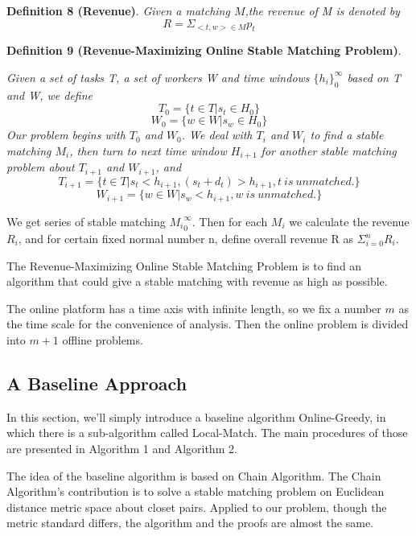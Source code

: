 \documentclass[color,twoside,amssymb,twocolumn]{article}
\begin{document}
\textbf{Definition 8 (Revenue)}. {\it Given a matching $M$,the revenue of M is denoted by 
	\begin{equation}
	R = \Sigma_{<t,w>\in M}p_t
	\end{equation}
}

\textbf{Definition 9 (Revenue-Maximizing Online Stable Matching Problem)}. {\it Given a set of tasks T, a set of workers W and time windows $\{h_i\}_{0}^{\infty}$ based on T and W, we define
	\begin{equation}
	T_0=\{t\in T|s_t \in H_0\}
	\end{equation}
	\begin{equation}
	W_0=\{w\in W|s_w \in H_0\}
	\end{equation}
	Our problem begins with $T_0$ and $W_0$. We deal with $T_i$ and $W_i$ to find a stable matching $M_i$, then turn to next time window $H_{i+1}$ for another stable matching problem about $T_{i+1}$ and $W_{i+1}$, and
	\begin{equation}
	T_{i+1}=\{t\in T|s_t<h_{i+1},(s_t+d_t)>h_{i+1},t\ is\ unmatched.\}
	\end{equation}
	\begin{equation}
	W_{i+1}=\{w\in W|s_w<h_{i+1},w\ is\ unmatched.\}
	\end{equation}
	
We get series of stable matching ${M_i}_0^{\infty}$. Then for each $M_i$ we calculate the revenue $R_i$, and for certain fixed normal number n, define overall revenue R as $\Sigma_{i=0}^{n}R_i$. 

The Revenue-Maximizing Online Stable Matching Problem is to find an algorithm that could give a stable matching with revenue as high as possible. 
}

The online platform has a time axis with infinite length, so we fix a number $m$ as the time scale for the convenience of analysis. Then the online problem is divided into $m+1$ offline problems. 

\subsection{A Baseline Approach}
In this section, we'll simply introduce a baseline algorithm Online-Greedy, in which there is a sub-algorithm called Local-Match. The main procedures of those are presented in Algorithm 1 and Algorithm 2.

The idea of the baseline algorithm is based on Chain Algorithm\cite{wong2007efficient,karp1990optimal}. The Chain Algorithm's contribution is to solve a stable matching problem on Euclidean distance metric space about closet pairs. Applied to our problem, though the metric standard differs, the algorithm and the proofs are almost the same. 
\end{document}

